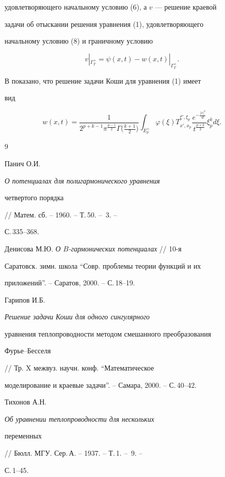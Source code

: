 удовлетворяющего начальному условию (6), а $v$ --- решение краевой 


задачи об отыскании решения уравнения (1), удовлетворяющего


начальному условию (8) и граничному условию


$$ 


v|_{\Gamma^+_T}=\psi(x,t)-w(x,t)|_{\Gamma^+_T}. 


$$ 


 


В \cite{3} показано, что решение задачи Коши для уравнения (1) имеет 


вид 


$$ 


w(x,t)=\frac{1} 


{2^{p+k-1}\pi^{\frac{p-1}{2}}\Gamma\big(\frac{k+1}{2}\big)} 


\int_{E^+_p}\varphi(\xi) 


T^{\xi',\xi_p}_{x',x_p} 


\frac{e^{-\frac{|x|^2}{4t}}}{t^{\frac{p+k}{2}}} 


\xi^k_p d\xi. 


$$ 


 


 


\begin{thebibliography}{9} 


 




Панич О.И. {\em О потенциалах для полигармонического уравнения 


четвертого порядка} // Матем. сб. -- 1960. -- Т.\,50. -- \No\,3. -- 


С.\,335--368. 




Денисова М.Ю. {\em О $B$-гармонических потенциалах} // 10-я 


Саратовск. зимн. школа ``Совр. проблемы теории функций и их 


приложений''. -- Саратов, 2000. -- С.\,18--19. 




Гарипов И.Б. {\em Решение задачи Коши для одного сингулярного 


уравнения теплопроводности методом смешанного преобразования 


Фурье--Бесселя} // Тр. X межвуз. научн. конф. ``Математическое 


моделирование и краевые задачи''. -- Самара, 2000. -- С.\,40--42. 




Тихонов А.Н. {\em Об уравнении теплопроводности для нескольких 


переменных} // Бюлл. МГУ. Сер.\,А. -- 1937. -- Т.\,1. -- \No\,9. -- 


С.\,1--45. 


 


\end{thebibliography} 


